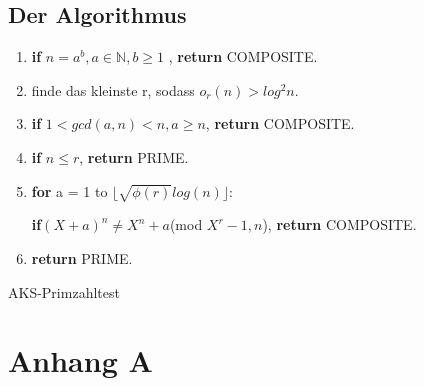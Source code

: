 \documentclass[12pt,oneside]{article}
\theoremstyle{remark}
\theoremstyle{definition}
\begin{document}
\subsection{Der Algorithmus}
\begin{algorithm}[H]
\SetAlgoLined
{}

\begin{enumerate}
\item \textbf{if} $n = a^b, a \in \mathbb{N}, b \geq 1$ , \textbf{return} COMPOSITE.
\item  finde das kleinste r, sodass $o_{r}(n) > log^2 n $.
\item \textbf{if} $1 < gcd(a,n) < n, a \geq n $, \textbf{return} COMPOSITE.
\item \textbf{if} $n \leq r $, \textbf{return} PRIME.
\item \textbf{for} a = 1 to $\lfloor \sqrt{\phi(r)}log(n) \rfloor$:

 \textbf{if}$(X + a)^n \neq X^n + a $(mod $X^r - 1, n$), \textbf{return} COMPOSITE.
 \item \textbf{return} PRIME.
\end{enumerate}
 
\caption{AKS-Primzahltest}
\end{algorithm}





\clearpage
\lhead{}
\printbibliography
{}


\clearpage
\appendix
\section{Anhang A}


\end{document}
